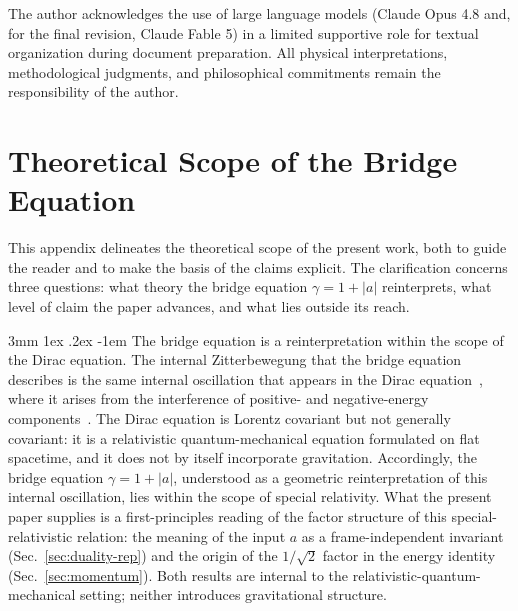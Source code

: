 \documentclass[%
 reprint, amsmath,amssymb, aps, prb, ]{revtex4-2}
\makeatletter
\numberwithin{equation}{section}
\renewcommand\paragraph{%
  \@startsection{paragraph}{4}{\z@}%
    {3mm \@plus 1ex \@minus .2ex}%
    {-1em}%
    {\normalfont\normalsize\itshape}}
\makeatother
\begin{document}
The author acknowledges the use of large language models (Claude Opus 4.8 and, for the final revision, Claude Fable 5) in a limited supportive role for textual organization during document preparation. All physical interpretations, methodological judgments, and philosophical commitments remain the responsibility of the author.

\appendix

\section{Theoretical Scope of the Bridge Equation}
\label{app:scope}

This appendix delineates the theoretical scope of the present work, both to guide the reader and to make the basis of the claims explicit. The clarification concerns three questions: what theory the bridge equation $\gamma = 1 + \lvert a\rvert$ reinterprets, what level of claim the paper advances, and what lies outside its reach.

\paragraph{The bridge equation is a reinterpretation within the scope of the Dirac equation.}
The internal Zitterbewegung that the bridge equation describes is the same internal oscillation that appears in the Dirac equation~\cite{dirac1928}, where it arises from the interference of positive- and negative-energy components~\cite{schrodinger1930}. The Dirac equation is Lorentz covariant but not generally covariant: it is a relativistic quantum-mechanical equation formulated on flat spacetime, and it does not by itself incorporate gravitation. Accordingly, the bridge equation $\gamma = 1 + \lvert a\rvert$, understood as a geometric reinterpretation of this internal oscillation, lies within the scope of special relativity. What the present paper supplies is a first-principles reading of the factor structure of this special-relativistic relation: the meaning of the input $a$ as a frame-independent invariant (Sec.~\ref{sec:duality-rep}) and the origin of the $1/\sqrt{2}$ factor in the energy identity (Sec.~\ref{sec:momentum}). Both results are internal to the relativistic-quantum-mechanical setting; neither introduces gravitational structure.
\end{document}
